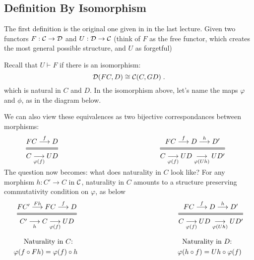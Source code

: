 \subsection{Definition By Isomorphism}
The first definition is the original one given in in the last lecture. Given two functors $F: \mathcal{C} \to \mathcal{D}$ and $U: \mathcal{D} \to \mathcal{C}$ (think of $F$ as the free functor, which creates the most general possible structure, and $U$ as forgetful) 
 \begin{center}
\end{center}
Recall that $U \vdash F$ if there is an isomorphism:
\begin{equation*}
\mathcal{D}(F C, D) \cong 
  \mathcal{C}(C, G D) \;.
\end{equation*}
which is natural in $C$ and $D$. In the isomorphism above, let's name the maps $\varphi$ and $\phi$, as in the diagram below.
\begin{center}
\end{center}
We can also view these equivalences as two bijective correspondances between morphisms:
\begin{align*}
\Efrac{ F C \overset{f}\longrightarrow D}
{C \underset{\varphi(f)}\longrightarrow UD}
&\hspace{2in}
\Efrac{F C \overset{f}\longrightarrow D \overset{h}\longrightarrow D'}
{C \underset{\varphi(f)}\longrightarrow UD \underset{\varphi(U h)}\longrightarrow UD'}
\end{align*}
The question now becomes: what does naturality in $C$ look like? For any morphism $h : C' \to C$ in $\mathcal{C}$, naturality in $C$ amounts to a structure preserving commutativity condition on $\varphi$, as below
\begin{align*}
  \Efrac{F C' \overset{Fh}\longrightarrow F C \overset{f}\longrightarrow D}
  {C' \underset{h}\longrightarrow C \underset{\varphi(f)}\longrightarrow UD}
  &\hspace{2in}
  \Efrac{F C \overset{f}\longrightarrow D \overset{h}\longrightarrow D'}
    {C \underset{\varphi(f)}\longrightarrow UD \underset{\varphi(U h)}\longrightarrow UD'}
  \\[1em]
  \text{Naturality in $C$:}~~&\hspace{2in}~~\text{Naturality in $D$:} \\
  \varphi(f \comp F h) = \varphi(f) \comp h
  &\hspace{2in}
    \varphi(h \comp f) = Uh \comp \varphi(f)
\end{align*}

